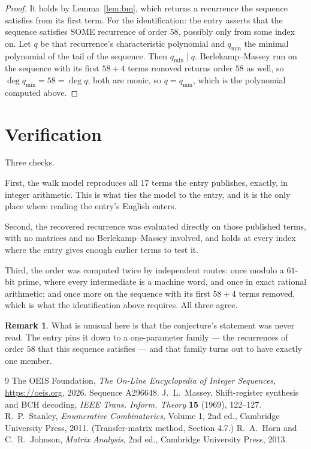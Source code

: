 \documentclass[11pt,a4paper]{article}
\theoremstyle{plain}
\theoremstyle{definition}
\newtheorem{remark}[theorem]{Remark}
\begin{document}
\begin{proof}
It holds by Lemma~\ref{lem:bm}, which returns a recurrence the sequence satisfies from its
first term. For the identification: the entry asserts that the sequence satisfies SOME
recurrence of order $58$, possibly only from some index on. Let $q$ be that recurrence's
characteristic polynomial and $q_{\min}$ the minimal polynomial of the tail of the sequence.
Then $q_{\min}\mid q$. Berlekamp--Massey run on the sequence with its first $58+4$ terms
removed returns order $58$ as well, so $\deg q_{\min}=58=\deg q$; both are monic, so
$q=q_{\min}$, which is the polynomial computed above.
\end{proof}

\section{Verification}

Three checks.

First, the walk model reproduces all $17$ terms the entry publishes, exactly, in integer
arithmetic. This is what ties the model to the entry, and it is the only place where reading
the entry's English enters.

Second, the recovered recurrence was evaluated directly on those published terms, with no
matrices and no Berlekamp--Massey involved, and holds at every index where the entry gives
enough earlier terms to test it.

Third, the order was computed twice by independent routes: once modulo a $61$-bit prime, where
every intermediate is a machine word, and once in exact rational arithmetic; and once more on
the sequence with its first $58+4$ terms removed, which is what the identification above
requires. All three agree.

\begin{remark}
What is unusual here is that the conjecture's statement was never read. The entry pins it down
to a one-parameter family --- the recurrences of order $58$ that this sequence satisfies
--- and that family turns out to have exactly one member.
\end{remark}

\begin{thebibliography}{9}
 The OEIS Foundation, \emph{The On-Line Encyclopedia of Integer
Sequences}, \url{https://oeis.org}, 2026. Sequence A296648.
 J.~L.~Massey, Shift-register synthesis and BCH decoding, \emph{IEEE
Trans. Inform. Theory} \textbf{15} (1969), 122--127.
 R.~P.~Stanley, \emph{Enumerative Combinatorics}, Volume 1, 2nd ed.,
Cambridge University Press, 2011. (Transfer-matrix method, Section 4.7.)
 R.~A.~Horn and C.~R.~Johnson, \emph{Matrix Analysis}, 2nd ed., Cambridge
University Press, 2013.
\end{thebibliography}
\end{document}
